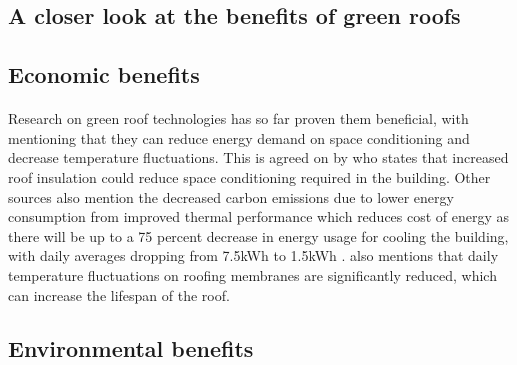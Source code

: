 \documentclass{article}
\begin{document}
\begin{multicols}{2}
  \section{A closer look at the benefits of green roofs} \label{sec:benef}
  \subsection{Economic benefits}
  \paragraph{} Research on green roof technologies has so far proven them
  beneficial, with \cite{energeff} mentioning that they can reduce energy
  demand on space conditioning and decrease temperature fluctuations. This
  is agreed on by \cite{CFGRSG} who states that increased roof insulation
  could reduce space conditioning required in the building. Other
  sources also mention the decreased carbon emissions due to lower energy
  consumption from improved thermal performance \parencite{CommAwareGBSyd}
  which reduces cost of energy as there will be up to a 75 percent
  decrease in energy usage for cooling the building, with daily averages
  dropping from 7.5kWh to 1.5kWh \parencite{energeff}. \cite{energeff} also
  mentions that daily temperature fluctuations on roofing membranes are
  significantly reduced, which can increase the lifespan of the roof.


  \subsection{Environmental benefits}

\end{multicols}
\end{document}
